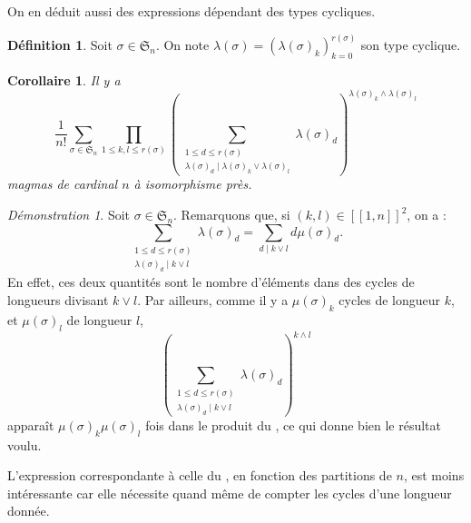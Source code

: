 \documentclass{article}
\newtheorem{corollaire}{Corollaire}
\theoremstyle{definition}
\newtheorem*{definition}{Définition}
\theoremstyle{remark}
\newtheorem*{demonstration}{Démonstration}
\begin{document}
On en déduit aussi des expressions dépendant des types cycliques.

\begin{definition}
    Soit $\sigma\in\mathfrak S_n$. On note $\lambda(\sigma)=(\lambda(\sigma)_k)_{k=0}^{r(\sigma)}$ son type cyclique.
\end{definition}

\begin{corollaire}
    Il y a
    $$\frac{1}{n!}\sum_{\sigma\in\mathfrak S_n}\prod_{1\leq k,l\leq r(\sigma)}\left(\sum_{\substack{1\leq d\leq r(\sigma)\\\lambda(\sigma)_d\mid \lambda(\sigma)_k\lor \lambda(\sigma)_l}}\lambda(\sigma)_d\right)^{\lambda(\sigma)_k\land \lambda(\sigma)_l}$$
magmas de cardinal $n$ à isomorphisme près.
\end{corollaire}

\begin{demonstration}
    Soit $\sigma\in\mathfrak S_n$. Remarquons que, si $(k,l)\in [\![1,n]\!]^2$, on a :
    $$\sum_{\substack{1\leq d\leq r(\sigma)\\\lambda(\sigma)_d\mid k\lor l}}\lambda(\sigma)_d=\sum_{d\mid k\lor l}d\mu(\sigma)_d.$$
    En effet, ces deux quantités sont le nombre d'éléments dans des cycles de longueurs divisant $k\lor l$.
    Par ailleurs, comme il y a $\mu(\sigma)_k$ cycles de longueur $k$, et $\mu(\sigma)_l$ de longueur $l$,
    $$\left(\sum_{\substack{1\leq d\leq r(\sigma)\\\lambda(\sigma)_d\mid k\lor l}}\lambda(\sigma)_d\right)^{k\land l}$$
    apparaît $\mu(\sigma)_k\mu(\sigma)_l$ fois dans le produit du , ce qui donne bien le résultat voulu.
\end{demonstration}

L'expression correspondante à celle du , en fonction des partitions de $n$, est moins intéressante car elle nécessite quand même de compter les cycles d'une longueur donnée.
\end{document}

